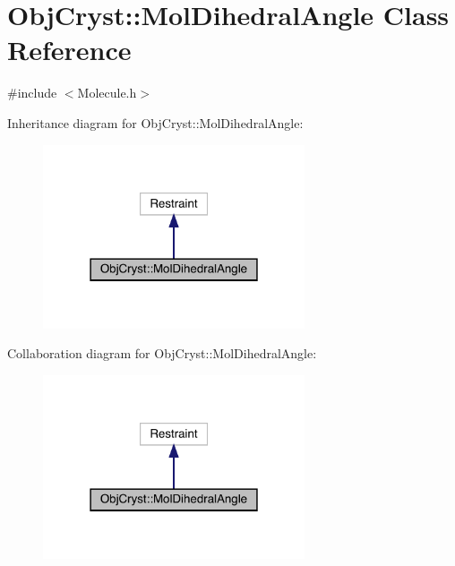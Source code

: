 \hypertarget{class_obj_cryst_1_1_mol_dihedral_angle}{}\section{Obj\+Cryst\+::Mol\+Dihedral\+Angle Class Reference}
\label{class_obj_cryst_1_1_mol_dihedral_angle}


{\ttfamily \#include $<$Molecule.\+h$>$}



Inheritance diagram for Obj\+Cryst\+::Mol\+Dihedral\+Angle\+:
\nopagebreak
\begin{figure}[H]
\begin{center}
\leavevmode
\includegraphics[width=219pt]{class_obj_cryst_1_1_mol_dihedral_angle__inherit__graph}
\end{center}
\end{figure}


Collaboration diagram for Obj\+Cryst\+::Mol\+Dihedral\+Angle\+:
\nopagebreak
\begin{figure}[H]
\begin{center}
\leavevmode
\includegraphics[width=219pt]{class_obj_cryst_1_1_mol_dihedral_angle__coll__graph}
\end{center}
\end{figure}
